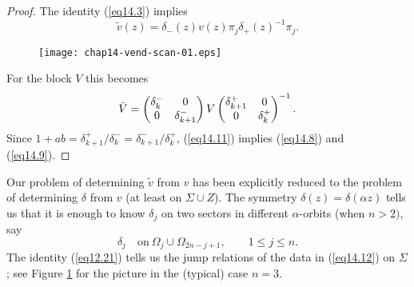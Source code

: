 \documentclass{surv-l}
\theoremstyle{plain}
\theoremstyle{definition}
\numberwithin{equation}{chapter}
\begin{document}
\begin{proof}
The identity (\ref{eq14.3}) implies
\begin{equation}\label{eq14.10}
\tilde{v}(z)=\delta_{-}(z)v(z)\pi_{j}\delta_{+}(z)^{-1}\pi_{j}.
\end{equation}
\begin{figure}
\texttt{[image: chap14-vend-scan-01.eps]}
\caption{}\label{fig4}
\end{figure}
For the block $V$ this becomes
\begin{align}\label{eq14.11}
\tilde{V}=\left(\begin{array}{@{}cc@{}}
\delta_{k}^{-} & 0\\
0 & \delta_{k+1}^{-}
\end{array}\right) V \left(\begin{array}{@{}cc@{}}
\delta_{k+1}^{+} & 0\\
0 & \delta_{k}^{+}
\end{array}\right)^{-1}.
\end{align}
Since $1+ab=\delta_{k+1}^{+}/\delta_{k}^{-}=\delta_{k+1}^{-}/\delta_{k}^{+}$, (\ref{eq14.11}) implies (\ref{eq14.8}) and (\ref{eq14.9}).\quad
\end{proof}
Our problem of determining $\tilde{v}$ from $v$ has been explicitly reduced to the problem of determining $\delta$ from $v$ (at least on $\Sigma\cup Z$). The symmetry $\delta(z)=\delta(\alpha z)$ tells us that it is enough to know $\delta_{j}$ on two sectors in different $\alpha$-orbits (when $n>2)$, say
\begin{equation}\label{eq14.12}
\delta_{j}\quad \mathrm{on}\ \Omega_{j}\cup\Omega_{2n-j+1},\qquad 1\leq j\leq n.
\end{equation}
The identity (\ref{eq12.21}) tells us the jump relations of the data in (\ref{eq14.12}) on $\Sigma$; see Figure \ref{fig4} for the picture in the (typical) case $n=3$.
\setcounter{theorem}{12}
\end{document}
